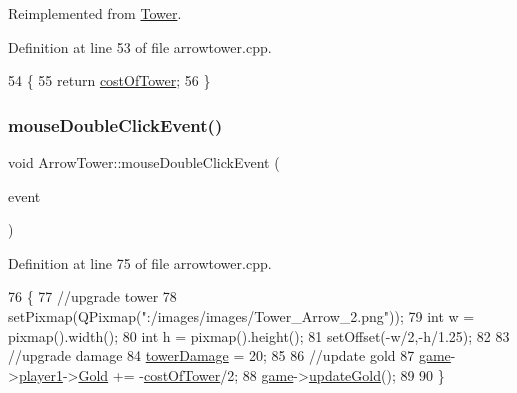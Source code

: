 Reimplemented from \hyperlink{class_tower_ae1d3f44d0149c8146ccf6b262a52ddad}{Tower}.



Definition at line 53 of file arrowtower.\+cpp.


\begin{DoxyCode}
54 \{
55     \textcolor{keywordflow}{return} \hyperlink{class_arrow_tower_a5205aca3c7be32a30266f6e059857d90}{costOfTower};
56 \}
\end{DoxyCode}
\mbox{\label{class_arrow_tower_a074c896d5ead33710d51e1c62a92862f}} 
\subsubsection{\texorpdfstring{mouse\+Double\+Click\+Event()}{mouseDoubleClickEvent()}}
{\footnotesize\ttfamily void Arrow\+Tower\+::mouse\+Double\+Click\+Event (\begin{DoxyParamCaption}\item[{Q\+Graphics\+Scene\+Mouse\+Event $\ast$}]{event }\end{DoxyParamCaption})}



Definition at line 75 of file arrowtower.\+cpp.


\begin{DoxyCode}
76 \{
77     \textcolor{comment}{//upgrade tower}
78     setPixmap(QPixmap(\textcolor{stringliteral}{":/images/images/Tower\_Arrow\_2.png"}));
79     \textcolor{keywordtype}{int} w = pixmap().width();
80     \textcolor{keywordtype}{int} h = pixmap().height();
81     setOffset(-w/2,-h/1.25);
82 
83     \textcolor{comment}{//upgrade damage}
84     \hyperlink{class_arrow_tower_a3623752851bb010bb650ca63ed9dd26c}{towerDamage} = 20;
85 
86     \textcolor{comment}{//update gold}
87     \hyperlink{arrowtower_8cpp_a58bdb5643d0814ac4e697a1564b79b70}{game}->\hyperlink{class_game_ad8a7cc146f99c7ec5b7c3c25d73f118c}{player1}->\hyperlink{class_player1_ab390478b345e443398bac442a04b675c}{Gold} += -\hyperlink{class_arrow_tower_a5205aca3c7be32a30266f6e059857d90}{costOfTower}/2;
88     \hyperlink{arrowtower_8cpp_a58bdb5643d0814ac4e697a1564b79b70}{game}->\hyperlink{class_game_a065998f7609f63e2987ede928359595a}{updateGold}();
89 
90 \}
\end{DoxyCode}
\mbox{\label{class_arrow_tower_afe62ccd8838829a0d7023d8eff079be2}} 
